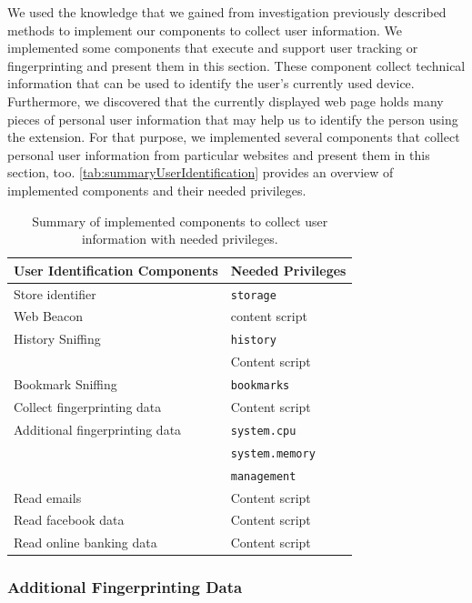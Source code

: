 	We used the knowledge that we gained from investigation previously described methods to implement our components to collect user information. We implemented some components that execute and support user tracking or fingerprinting and present them in this section. These component collect technical information that can be used to identify the user's currently used device. Furthermore, we discovered that the currently displayed web page holds many pieces of personal user information that may help us to identify the person using the extension. For that purpose, we implemented several components that collect personal user information from particular websites and present them in this section, too. \autoref{tab:summaryUserIdentification} provides an overview of implemented components and their needed privileges.
  	
  	\begin{table}[h]
  		\centering
  		\begin{tabular}{|l|l|} \hline 
  			\textbf{User Identification Components} & \textbf{Needed Privileges} \\ \hline
  			Store identifier & \texttt{storage} \\ 	\hline
  			Web Beacon & content script \\ \hline
  			History Sniffing & \texttt{history} \\
  			& Content script \\	\hline
  			Bookmark Sniffing & \texttt{bookmarks} \\ \hline
  			Collect fingerprinting data & Content script \\ \hline
  			Additional fingerprinting data & \texttt{system.cpu} \\
  			& \texttt{system.memory} \\
  			& \texttt{management} \\ \hline
  			Read emails & Content script \\ 
  			Read facebook data & Content script \\
  			Read online banking data & Content script \\ \hline
  		\end{tabular}
  		\caption{Summary of implemented components to collect user information with needed privileges.}
  		\label{tab:summaryUserIdentification}
  	\end{table}
  
\subsubsection{Additional Fingerprinting Data} 
\label{sec:additionalFingerprintingData}

